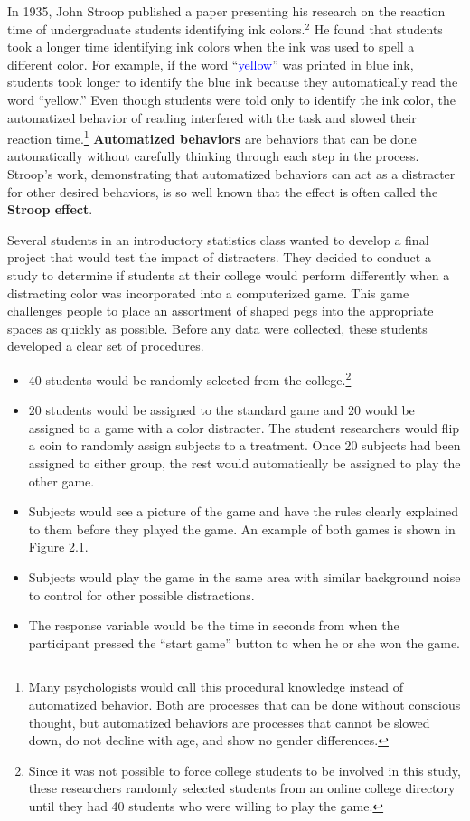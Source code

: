 \documentclass[
]{report}
\begin{document}
In 1935, John Stroop published a paper presenting his research on the reaction time of undergraduate students identifying ink colors.\(^2\) He found that students took a longer time identifying ink colors when the ink was used to spell a different color. For example, if the word ``\textcolor{blue}{yellow}'' was printed in blue ink, students took longer to identify the blue ink because they automatically read the word ``yellow.'' Even though students were told only to identify the ink color, the automatized behavior of reading interfered with the task and slowed their reaction time.\footnote{Many psychologists would call this procedural knowledge instead of automatized behavior. Both are processes that can be done without conscious thought, but automatized behaviors are processes that cannot be slowed down, do not
  decline with age, and show no gender differences.} \textbf{Automatized behaviors} are behaviors that can be done automatically without carefully thinking through each step in the process. Stroop's work, demonstrating that automatized behaviors can act as a distracter for other desired behaviors, is so well known that the effect is often called the \textbf{Stroop effect}.

Several students in an introductory statistics class wanted to develop a final project that would test the impact of distracters. They decided to conduct a study to determine if students at their college would perform differently when a distracting color was incorporated into a computerized game. This game challenges people to place an assortment of shaped pegs into the appropriate spaces as quickly as possible. Before any data were collected, these students developed a clear set of procedures.
\vspace{-1em}

\begin{itemize}
\item 40 students would be randomly selected from the college.\footnote{Since it was not possible to force college students to be involved in this study, these researchers randomly selected students from an online college directory until they had 40 students who were willing to play the game.}
\item 20 students would be assigned to the standard game and 20 would be assigned to a game with a color distracter. The student researchers would flip a coin to randomly assign subjects to a treatment. Once 20 subjects had been assigned to either group, the rest would automatically be assigned to play the other game.
\item  Subjects would see a picture of the game and have the rules clearly explained to them before they
played the game. An example of both games is shown in Figure 2.1.
\item  Subjects would play the game in the same area with similar background noise to control for other
possible distractions.
\item  The response variable would be the time in seconds from when the participant pressed the “start game” button to when he or she won the game.
\end{itemize}
\end{document}
